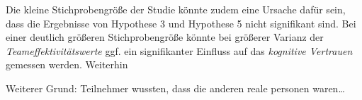 \documentclass[a4paper,11pt]{article}%
\renewcommand{\\}{\vspace*{0.5\baselineskip} \newline}
\begin{document}
Die kleine Stichprobengröße der Studie könnte zudem eine Ursache dafür sein, dass die Ergebnisse von Hypothese 3 und Hypothese 5 nicht signifikant sind. Bei einer deutlich größeren Stichprobengröße könnte bei größerer Varianz der \textit{Teameffektivitätswerte} ggf. ein signifikanter Einfluss auf das \textit{kognitive Vertrauen} gemessen werden.
Weiterhin 

Weiterer Grund: Teilnehmer wussten, dass die anderen reale personen waren… 

%
	
\end{document}

